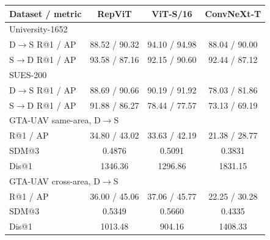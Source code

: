 \par\medskip\noindent\begin{minipage}{\columnwidth}
\captionsetup{type=table}
\centering
\caption{Retrieval comparison of compact backbones. R@1 and AP are percentages. SUES-200 results average the four heights, and Dis@1 is in meters.}
\label{tab:supp-compact-summary}\label{tab:supp-compact-gta}
{\footnotesize\setlength{\tabcolsep}{2pt}\renewcommand{\arraystretch}{1.04}
\begin{tabular*}{\columnwidth}{@{\extracolsep{\fill}}lccc@{}}
\toprule
Dataset / metric & RepViT & ViT-S/16 & ConvNeXt-T \\
\midrule
\multicolumn{4}{l}{University-1652} \\
D$\rightarrow$S R@1 / AP & 88.52 / 90.32 & 94.10 / 94.98 & 88.04 / 90.00 \\
S$\rightarrow$D R@1 / AP & 93.58 / 87.16 & 92.15 / 90.60 & 92.44 / 87.12 \\
\midrule
\multicolumn{4}{l}{SUES-200} \\
D$\rightarrow$S R@1 / AP & 88.69 / 90.66 & 90.19 / 91.92 & 78.03 / 81.86 \\
S$\rightarrow$D R@1 / AP & 91.88 / 86.27 & 78.44 / 77.57 & 73.13 / 69.19 \\
\midrule
\multicolumn{4}{l}{GTA-UAV same-area, D$\rightarrow$S} \\
R@1 / AP & 34.80 / 43.02 & 33.63 / 42.19 & 21.38 / 28.77 \\
SDM@3 & 0.4876 & 0.5091 & 0.3831 \\
Dis@1 & 1346.36 & 1296.86 & 1831.15 \\
\midrule
\multicolumn{4}{l}{GTA-UAV cross-area, D$\rightarrow$S} \\
R@1 / AP & 36.00 / 45.06 & 37.06 / 45.77 & 22.25 / 30.28 \\
SDM@3 & 0.5349 & 0.5660 & 0.4335 \\
Dis@1 & 1013.48 & 904.16 & 1408.33 \\
\bottomrule
\end{tabular*}}
\end{minipage}\par\medskip

